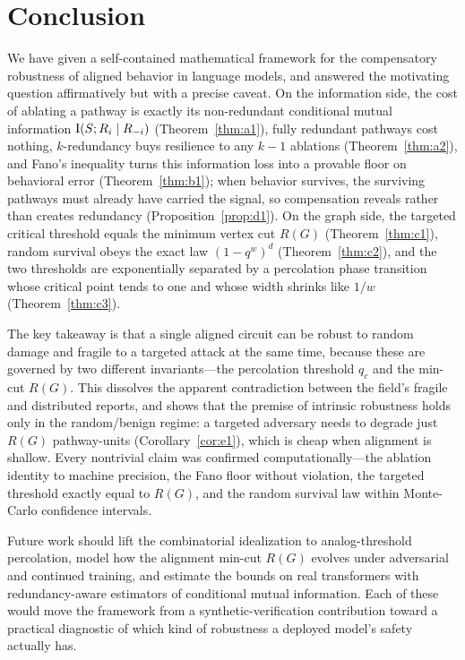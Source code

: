 \section{Conclusion}
\label{sec:conclusion}

We have given a self-contained mathematical framework for the compensatory robustness
of aligned behavior in language models, and answered the motivating question
affirmatively but with a precise caveat. On the information side, the cost of ablating
a pathway is exactly its non-redundant conditional mutual information
$\operatorname{I}(S;R_i\mid R_{-i})$ (Theorem~\ref{thm:a1}), fully redundant pathways cost nothing,
$k$-redundancy buys resilience to any $k-1$ ablations (Theorem~\ref{thm:a2}), and Fano's
inequality turns this information loss into a provable floor on behavioral error
(Theorem~\ref{thm:b1}); when behavior survives, the surviving pathways must already have
carried the signal, so compensation reveals rather than creates redundancy
(Proposition~\ref{prop:d1}). On the graph side, the targeted critical threshold equals
the minimum vertex cut $R(G)$ (Theorem~\ref{thm:c1}), random survival obeys the exact
law $(1-q^w)^d$ (Theorem~\ref{thm:c2}), and the two thresholds are exponentially
separated by a percolation phase transition whose critical point tends to one and whose
width shrinks like $1/w$ (Theorem~\ref{thm:c3}).

The key takeaway is that a single aligned circuit can be robust to random damage and
fragile to a targeted attack at the same time, because these are governed by two
different invariants---the percolation threshold $q_c$ and the min-cut $R(G)$. This
dissolves the apparent contradiction between the field's fragile and distributed
reports, and shows that the premise of intrinsic robustness holds only in the
random/benign regime: a targeted adversary needs to degrade just $R(G)$ pathway-units
(Corollary~\ref{cor:e1}), which is cheap when alignment is shallow. Every nontrivial
claim was confirmed computationally---the ablation identity to machine precision, the
Fano floor without violation, the targeted threshold exactly equal to $R(G)$, and the
random survival law within Monte-Carlo confidence intervals.

Future work should lift the combinatorial idealization to analog-threshold
percolation, model how the alignment min-cut $R(G)$ evolves under adversarial and
continued training, and estimate the bounds on real transformers with redundancy-aware
estimators of conditional mutual information. Each of these would move the framework
from a synthetic-verification contribution toward a practical diagnostic of which kind
of robustness a deployed model's safety actually has.
